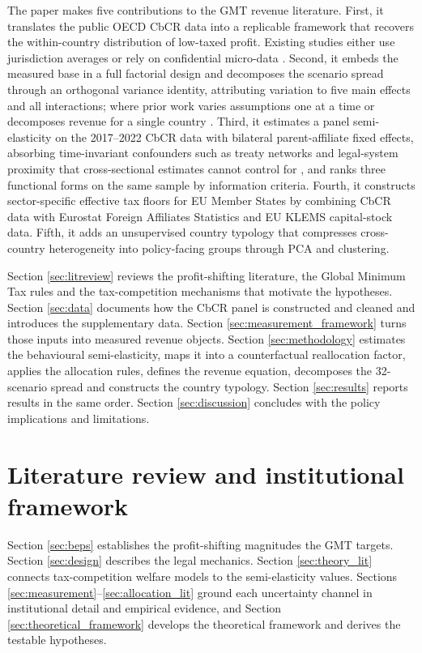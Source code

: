 \documentclass[11pt,a4paper]{article}
\begin{document}
The paper makes five contributions to the GMT revenue literature. First, it translates the public OECD CbCR data into a replicable framework that recovers the within-country distribution of low-taxed profit. Existing studies either use jurisdiction averages \citep{barake2022} or rely on confidential micro-data \citep{hugger2026}. Second, it embeds the measured base in a full factorial design and decomposes the scenario spread through an orthogonal variance identity, attributing variation to five main effects and all interactions; where prior work varies assumptions one at a time or decomposes revenue for a single country \citep{boukal2026}. Third, it estimates a panel semi-elasticity on the 2017--2022 CbCR data with bilateral parent-affiliate fixed effects, absorbing time-invariant confounders such as treaty networks and legal-system proximity that cross-sectional estimates cannot control for \citep{garcia-bernardo2024}, and ranks three functional forms on the same sample by information criteria. Fourth, it constructs sector-specific effective tax floors for EU Member States by combining CbCR data with Eurostat Foreign Affiliates Statistics and EU KLEMS capital-stock data. Fifth, it adds an unsupervised country typology that compresses cross-country heterogeneity into policy-facing groups through PCA and clustering.

Section \ref{sec:litreview} reviews the profit-shifting literature, the Global Minimum Tax rules and the tax-competition mechanisms that motivate the hypotheses. Section \ref{sec:data} documents how the CbCR panel is constructed and cleaned and introduces the supplementary data. Section \ref{sec:measurement_framework} turns those inputs into measured revenue objects. Section \ref{sec:methodology} estimates the behavioural semi-elasticity, maps it into a counterfactual reallocation factor, applies the allocation rules, defines the revenue equation, decomposes the 32-scenario spread and constructs the country typology. Section \ref{sec:results} reports results in the same order. Section \ref{sec:discussion} concludes with the policy implications and limitations. 

\section{Literature review and institutional framework}\label{sec:literature}\label{sec:litreview}

Section \ref{sec:beps} establishes the profit-shifting magnitudes the GMT targets. Section \ref{sec:design} describes the legal mechanics. Section \ref{sec:theory_lit} connects tax-competition welfare models to the semi-elasticity values. Sections \ref{sec:measurement}--\ref{sec:allocation_lit} ground each uncertainty channel in institutional detail and empirical evidence, and Section \ref{sec:theoretical_framework} develops the theoretical framework and derives the testable hypotheses.
\end{document}
